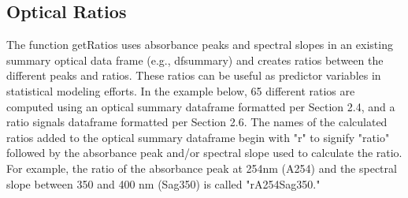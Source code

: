 \documentclass[a4paper,11pt]{article}\usepackage[]{graphicx}\usepackage[]{color}
\begin{document}
\subsection{Optical Ratios}
The function getRatios uses absorbance peaks and spectral slopes in an existing summary optical data frame (e.g., dfsummary) and creates ratios between the different peaks and ratios. These ratios can be useful as predictor variables in statistical modeling efforts. In the example below, 65 different ratios are computed using an optical summary dataframe formatted per Section 2.4, and a ratio signals dataframe formatted per Section 2.6. The names of the calculated ratios added to the optical summary dataframe begin with "r" to signify "ratio" followed by the absorbance peak and/or spectral slope used to calculate the ratio. For example, the ratio of the absorbance peak at 254nm (A254) and the spectral slope between 350 and 400 nm (Sag350) is called "rA254\textunderscore Sag350."
\end{document}
